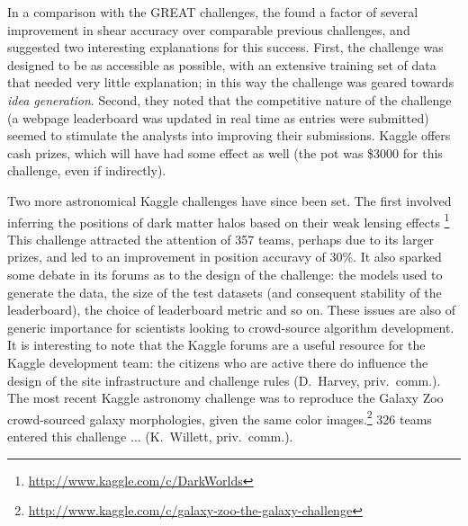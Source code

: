 \documentclass{ar2e}
\begin{document}
In a comparison with the GREAT challenges, the \citeauthor{KitchingEtal2013b}
found a factor of several improvement in shear accuracy over comparable previous
challenges, and suggested two interesting explanations for this success. First,
the challenge was designed to be as accessible as possible, with an extensive
training set of data that needed very little explanation; in this way the
challenge was geared towards {\it idea generation}. Second, they noted that the
competitive  nature of the challenge (a webpage leaderboard was updated in real
time as entries were submitted) seemed to stimulate the analysts into improving
their submissions. Kaggle offers cash prizes, which will have had some effect as
well (the pot was \$3000 for this challenge, even if indirectly).

Two more astronomical Kaggle challenges have since been set. The first
involved inferring the positions of dark matter halos based on their weak
lensing effects
\citep{Harvey++2014}\footnote{\url{http://www.kaggle.com/c/DarkWorlds}}  This
challenge attracted the attention of 357 teams, perhaps due to its larger
prizes, and led to an improvement in position accuravy of 30\%.  It also
sparked some debate in its forums as to the design of the challenge: the
models used to generate the data, the size of the test datasets (and
consequent stability of the leaderboard),  the choice of leaderboard metric
and so on. These issues are also of generic importance for scientists looking
to crowd-source algorithm development. It is interesting to note that the
Kaggle forums are a useful resource for the Kaggle development team: the
citizens who are active there do influence the design of the site
infrastructure and challenge rules (D.~Harvey, priv.~comm.). The most recent
Kaggle astronomy challenge was to reproduce the Galaxy Zoo crowd-sourced
galaxy morphologies, given the same color
images.\footnote{\url{http://www.kaggle.com/c/galaxy-zoo-the-galaxy-challenge}}
326 teams entered this challenge ... (K.\ Willett, priv.\ comm.).



\end{document}
